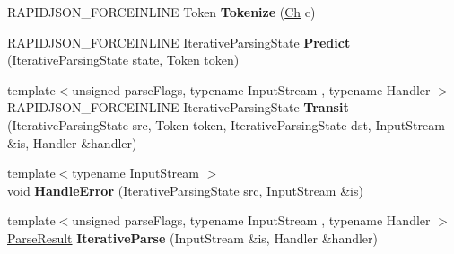 \begin{DoxyCompactItemize}
\item 
R\+A\+P\+I\+D\+J\+S\+O\+N\+\_\+\+F\+O\+R\+C\+E\+I\+N\+L\+I\+NE Token {\bfseries Tokenize} (\hyperlink{class_generic_reader_ab39a92bb26d50aee6469df604622218a}{Ch} c)\hypertarget{class_generic_reader_a9b3547ce0d99a8e53177c3d193e3d462}{}\label{class_generic_reader_a9b3547ce0d99a8e53177c3d193e3d462}

\item 
R\+A\+P\+I\+D\+J\+S\+O\+N\+\_\+\+F\+O\+R\+C\+E\+I\+N\+L\+I\+NE Iterative\+Parsing\+State {\bfseries Predict} (Iterative\+Parsing\+State state, Token token)\hypertarget{class_generic_reader_ae20c2989d379782f3bbf81561a67ebcd}{}\label{class_generic_reader_ae20c2989d379782f3bbf81561a67ebcd}

\item 
{\footnotesize template$<$unsigned parse\+Flags, typename Input\+Stream , typename Handler $>$ }\\R\+A\+P\+I\+D\+J\+S\+O\+N\+\_\+\+F\+O\+R\+C\+E\+I\+N\+L\+I\+NE Iterative\+Parsing\+State {\bfseries Transit} (Iterative\+Parsing\+State src, Token token, Iterative\+Parsing\+State dst, Input\+Stream \&is, Handler \&handler)\hypertarget{class_generic_reader_a09637865e7aea8e50fb8f9fc25dd65ad}{}\label{class_generic_reader_a09637865e7aea8e50fb8f9fc25dd65ad}

\item 
{\footnotesize template$<$typename Input\+Stream $>$ }\\void {\bfseries Handle\+Error} (Iterative\+Parsing\+State src, Input\+Stream \&is)\hypertarget{class_generic_reader_a46660019ff1ed42bc192d9b5f9119b0f}{}\label{class_generic_reader_a46660019ff1ed42bc192d9b5f9119b0f}

\item 
{\footnotesize template$<$unsigned parse\+Flags, typename Input\+Stream , typename Handler $>$ }\\\hyperlink{struct_parse_result}{Parse\+Result} {\bfseries Iterative\+Parse} (Input\+Stream \&is, Handler \&handler)\hypertarget{class_generic_reader_a55a2d3fd3d5261f26513ed303724bc3a}{}\label{class_generic_reader_a55a2d3fd3d5261f26513ed303724bc3a}

\end{DoxyCompactItemize}
